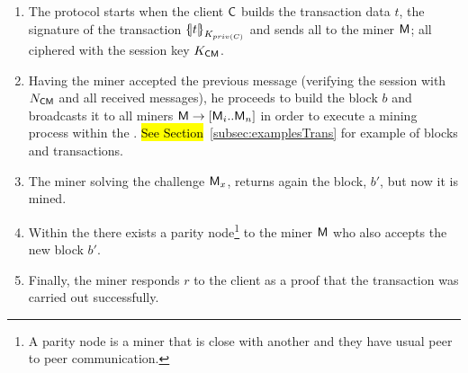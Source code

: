 \begin{enumerate}
    \item The protocol starts when the client $\textsf{C}$ builds the transaction 
        data $t$, the signature of the transaction $\fat{t}_{K_{priv(C)}}$ and sends
        all to the miner $\textsf{M}$; all ciphered with the 
        session key $K_{\textsf{C}\textsf{M}}$. 
    \item Having the miner accepted the previous message (verifying the  
        session with $N_{\textsf{C}\textsf{M}}$ and all received messages), he proceeds to build 
        the block $b$ and broadcasts it to all miners $\textsf{M}\rightarrow [\textsf{M}_i .. \textsf{M}_n]$
        in order to execute a mining process within the \blockchaincarnetwork.
        \hl{See Section}~\ref{subsec:examplesTrans} for example of blocks and transactions.

        
    \item The miner solving the challenge $\textsf{M}_x$, returns again the block, $b'$, 
        but now it is mined. 
    \item Within the \blockchaincarnetwork there exists a parity node\footnote{
            A parity node is a miner that is close with another and they have usual
            peer to peer communication.
        } to the miner $\textsf{M}$
        who also accepts the new block $b'$.
    \item Finally, the miner responds $r$ to the client as a proof that the transaction 
        was carried out successfully.
\end{enumerate}

